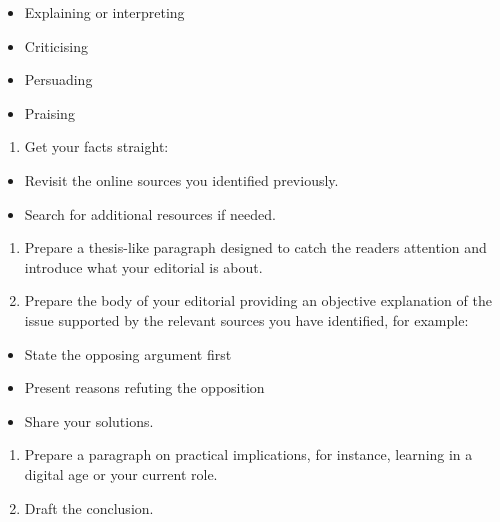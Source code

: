 \documentclass[
]{book}
\providecommand{\tightlist}{%
  \setlength{\itemsep}{0pt}\setlength{\parskip}{0pt}}
\theoremstyle{definition}
\theoremstyle{definition}
\theoremstyle{definition}
\theoremstyle{definition}
\theoremstyle{remark}
\begin{document}
\begin{reflect}
\begin{itemize}
\tightlist
\item
  Explaining or interpreting\\
\item
  Criticising\\
\item
  Persuading\\
\item
  Praising\\
\end{itemize}

\begin{enumerate}
\def\labelenumi{\arabic{enumi}.}
\setcounter{enumi}{5}
\tightlist
\item
  Get your facts straight:\\
\end{enumerate}

\begin{itemize}
\tightlist
\item
  Revisit the online sources you identified previously.\\
\item
  Search for additional resources if needed.\\
\end{itemize}

\begin{enumerate}
\def\labelenumi{\arabic{enumi}.}
\setcounter{enumi}{6}
\tightlist
\item
  Prepare a thesis-like paragraph designed to catch the readers attention and introduce what your editorial is about.\\
\item
  Prepare the body of your editorial providing an objective explanation of the issue supported by the relevant sources you have identified, for example:\\
\end{enumerate}

\begin{itemize}
\tightlist
\item
  State the opposing argument first\\
\item
  Present reasons refuting the opposition\\
\item
  Share your solutions.\\
\end{itemize}

\begin{enumerate}
\def\labelenumi{\arabic{enumi}.}
\setcounter{enumi}{8}
\tightlist
\item
  Prepare a paragraph on practical implications, for instance, learning in a digital age or your current role.\\
\item
  Draft the conclusion.
\end{enumerate}
\end{reflect}
\end{document}
